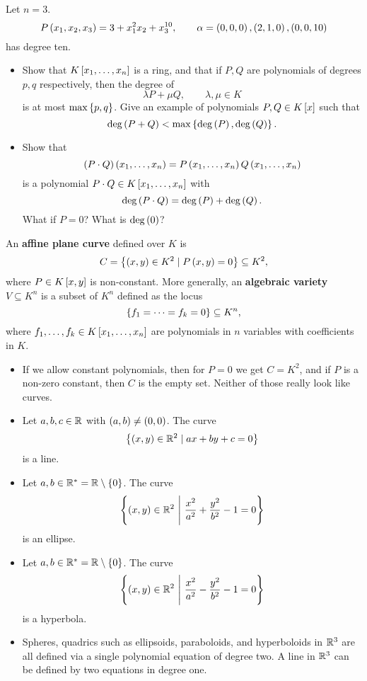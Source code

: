 \begin{example*}
Let $ n = 3 $.
$$ P\rb{x_1, x_2, x_3} = 3 + x_1^2x_2 + x_3^{10}, \qquad \alpha = \rb{0, 0, 0}, \rb{2, 1, 0}, \rb{0, 0, 10} $$
has degree ten.
\end{example*}

\begin{exercise}
\hfill
\begin{itemize}
\item Show that $ K\sb{x_1, \dots, x_n} $ is a ring, and that if $ P, Q $ are polynomials of degrees $ p, q $ respectively, then the degree of
$$ \lambda P + \mu Q, \qquad \lambda, \mu \in K $$
is at most $ \max\cb{p, q} $. Give an example of polynomials $ P, Q \in K\sb{x} $ such that
$$ \deg\rb{P + Q} < \max\cb{\deg\rb{P}, \deg\rb{Q}}. $$
\item Show that
$$ \rb{P \cdot Q}\rb{x_1, \dots, x_n} = P\rb{x_1, \dots, x_n}Q\rb{x_1, \dots, x_n} $$
is a polynomial $ P \cdot Q \in K\sb{x_1, \dots, x_n} $ with
$$ \deg\rb{P \cdot Q} = \deg\rb{P} + \deg\rb{Q}. $$
What if $ P = 0 $? What is $ \deg\rb{0} $?
\end{itemize}
\end{exercise}

\begin{definition}
An \textbf{affine plane curve} defined over $ K $ is
$$ C = \cb{\rb{x, y} \in K^2 \mid P\rb{x, y} = 0} \subseteq K^2, $$
where $ P \in K\sb{x, y} $ is non-constant. More generally, an \textbf{algebraic variety} $ V \subseteq K^n $ is a subset of $ K^n $ defined as the locus
$$ \cb{f_1 = \dots = f_k = 0} \subseteq K^n, $$
where $ f_1, \dots, f_k \in K\sb{x_1, \dots, x_n} $ are polynomials in $ n $ variables with coefficients in $ K $.
\end{definition}

\begin{example}
\hfill
\begin{itemize}
\item If we allow constant polynomials, then for $ P = 0 $ we get $ C = K^2 $, and if $ P $ is a non-zero constant, then $ C $ is the empty set. Neither of those really look like curves.
\item Let $ a, b, c \in \R $ with $ \rb{a, b} \ne \rb{0, 0} $. The curve
$$ \cb{\rb{x, y} \in \R^2 \mid ax + by + c = 0} $$
is a line.
\item Let $ a, b \in \R^* = \R \setminus \cb{0} $. The curve
$$ \cb{\rb{x, y} \in \R^2 \ \Bigg| \ \dfrac{x^2}{a^2} + \dfrac{y^2}{b^2} - 1 = 0} $$
is an ellipse.
\item Let $ a, b \in \R^* = \R \setminus \cb{0} $. The curve
$$ \cb{\rb{x, y} \in \R^2 \ \Bigg| \ \dfrac{x^2}{a^2} - \dfrac{y^2}{b^2} - 1 = 0} $$
is a hyperbola.
\item Spheres, quadrics such as ellipsoids, paraboloids, and hyperboloids in $ \R^3 $ are all defined via a single polynomial equation of degree two. A line in $ \R^3 $ can be defined by two equations in degree one.
\end{itemize}
\end{example}

